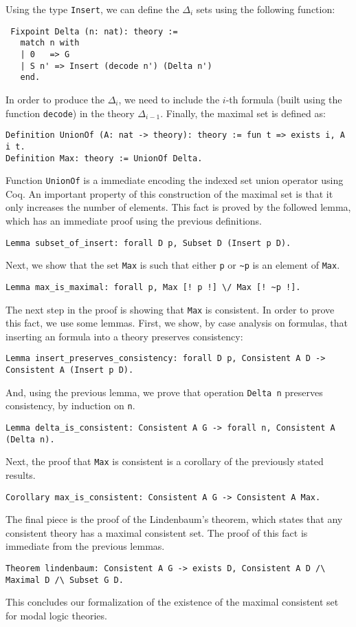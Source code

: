 \documentclass[3p,times]{elsarticle}
\begin{document}
Using the type \texttt{Insert}, we can define the $\Delta_{i}$ sets using the
following function:

\begin{verbatim}
 Fixpoint Delta (n: nat): theory :=
   match n with
   | 0   => G
   | S n' => Insert (decode n') (Delta n')
   end.
\end{verbatim}

In order to produce the $\Delta_{i}$, we need to include the $i$-th formula (built using the function \texttt{decode})
in the theory $\Delta_{i - 1}$. Finally, the maximal set is defined as:
\begin{verbatim}
Definition UnionOf (A: nat -> theory): theory := fun t => exists i, A i t.
Definition Max: theory := UnionOf Delta.
\end{verbatim}
Function \texttt{UnionOf} is a immediate encoding the indexed set union operator using Coq. An important property
of this construction of the maximal set is that it only increases the number of elements. This fact is proved by
the followed lemma, which has an immediate proof using the previous definitions.
\begin{verbatim}
Lemma subset_of_insert: forall D p, Subset D (Insert p D).
\end{verbatim}
Next, we show that the set \texttt{Max} is such that either \verb|p| or \verb|~p| is an element of \verb|Max|.
\begin{verbatim}
Lemma max_is_maximal: forall p, Max [! p !] \/ Max [! ~p !].
\end{verbatim}
The next step in the proof is showing that \texttt{Max} is consistent. In order to prove this fact,
we use some lemmas. First, we show, by case analysis on formulas, that inserting an formula into a theory
preserves consistency:
\begin{verbatim}
Lemma insert_preserves_consistency: forall D p, Consistent A D -> Consistent A (Insert p D).
\end{verbatim}
And, using the previous lemma, we prove that operation \texttt{Delta n} preserves consistency, by induction on \verb|n|.
\begin{verbatim}
Lemma delta_is_consistent: Consistent A G -> forall n, Consistent A (Delta n).
\end{verbatim}
Next, the proof that \texttt{Max} is consistent is a corollary of the previously stated results.
\begin{verbatim}
Corollary max_is_consistent: Consistent A G -> Consistent A Max.
\end{verbatim}
The final piece is the proof of the Lindenbaum's theorem, which states that any consistent theory has
a maximal consistent set. The proof of this fact is immediate from the previous lemmas.
\begin{verbatim}
Theorem lindenbaum: Consistent A G -> exists D, Consistent A D /\ Maximal D /\ Subset G D.
\end{verbatim}
This concludes our formalization of the existence of the maximal consistent set for modal logic theories.
\end{document}
